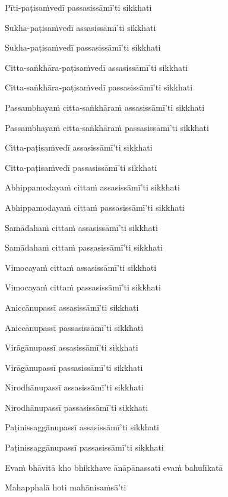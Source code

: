 {Pīti-paṭisaṁvedī passasissāmī'ti sikkhati

Sukha-paṭisaṁvedī assasissāmī'ti sikkhati

Sukha-paṭisaṁvedī passasissāmī'ti sikkhati

Citta-saṅkhāra-paṭisaṁvedī assasissāmī'ti sikkhati

Citta-saṅkhāra-paṭisaṁvedī passasissāmī'ti sikkhati

Passambhayaṁ citta-saṅkhāraṁ assasissāmī'ti sikkhati

Passambhayaṁ citta-saṅkhāraṁ passasissāmī'ti sikkhati

Citta-paṭisaṁvedī assasissāmī'ti sikkhati

Citta-paṭisaṁvedī passasissāmī'ti sikkhati

Abhippamodayaṁ cittaṁ assasissāmī'ti sikkhati

Abhippamodayaṁ cittaṁ passasissāmī'ti sikkhati

Samādahaṁ cittaṁ assasissāmī'ti sikkhati

Samādahaṁ cittaṁ passasissāmī'ti sikkhati

Vimocayaṁ cittaṁ assasissāmī'ti sikkhati

Vimocayaṁ cittaṁ passasissāmī'ti sikkhati

Aniccānupassī assasissāmī'ti sikkhati

Aniccānupassī passasissāmī'ti sikkhati

Virāgānupassī assasissāmī'ti sikkhati

Virāgānupassī passasissāmī'ti sikkhati

Nirodhānupassī assasissāmī'ti sikkhati

Nirodhānupassī passasissāmī'ti sikkhati

Paṭinissaggānupassī assasissāmī'ti sikkhati

Paṭinissaggānupassī passasissāmī'ti sikkhati

Evaṁ bhāvitā kho bhikkhave ānāpānassati evaṁ bahulīkatā

Mahapphalā hoti mahānisaṁsā'ti


}


